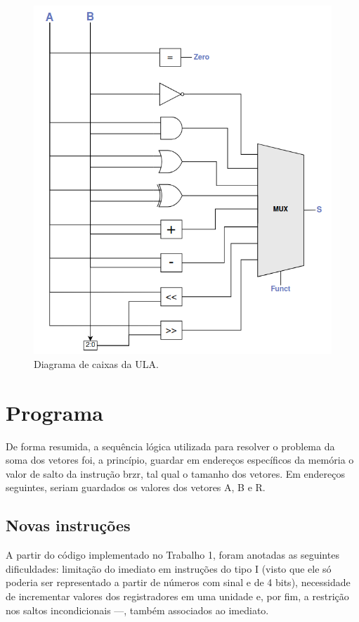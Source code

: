 \documentclass[twocolumn, 11pt]{article}
\begin{document}
\begin{figure}[h]
    \centering
    \includegraphics[width=1\linewidth]{projeto_ula.png}
    \caption{Diagrama de caixas da ULA.}
    \label{fig:enter-label}
\end{figure}

\section{Programa}

De forma resumida, a sequência lógica utilizada para resolver o problema da soma dos vetores foi, a princípio, guardar em endereços específicos da memória o valor de salto da instrução brzr, tal qual o tamanho dos vetores. Em endereços seguintes, seriam guardados os valores dos vetores A, B e R.

\subsection{Novas instruções}

A partir do código implementado no Trabalho 1, foram anotadas as seguintes dificuldades: limitação do imediato em instruções do tipo I (visto que ele só poderia ser representado a partir de números com sinal e de 4 bits), necessidade de incrementar valores dos registradores em uma unidade e, por fim, a restrição nos saltos incondicionais —, também associados ao imediato.
\end{document}
